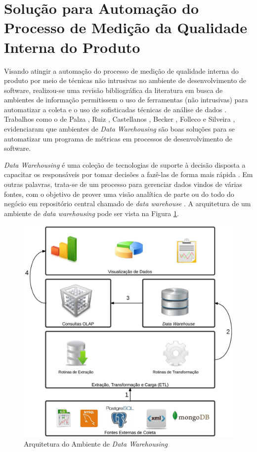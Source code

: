 \section{Solução para Automação do Processo de Medição da Qualidade Interna do Produto}
\label{sec:solucao}

Visando atingir a automação do processo de medição de qualidade interna do produto por meio de técnicas não intrusivas no ambiente de desenvolvimento de software, realizou-se uma revisão bibliográfica da literatura em busca de ambientes de informação permitissem o uso de ferramentas (não intrusivas) para automatizar a coleta e o uso de sofisticadas técnicas de análise de dados \cite{Gopal2005} . Trabalhos como o de Palza \cite{Palza2003},  Ruiz \cite{Ruiz2005}, Castellanos \cite{Castellanos2005},  Becker \cite{Becker2006}, Folleco \cite{Folleco2007} e Silveira \cite{Silveira2010}, evidenciaram que ambientes de \textit{Data Warehousing} são boas soluções para se automatizar um programa de métricas em processos de desenvolvimento de software.

\textit{Data Warehousing} é uma coleção de tecnologias de suporte à decisão disposta a capacitar os responsáveis por tomar decisões a fazê-las de forma mais rápida \cite{chaudhuri1997} \cite{andre2000}. Em outras palavras, trata-se de um processo para gerenciar dados vindos de várias fontes, com o objetivo de prover uma visão analítica de parte ou do todo do negócio em repositório central chamado de \textit{data warehouse} \cite{gardner1998} \cite{Kimball2002}. A arquitetura de um ambiente de \textit{data warehousing} pode ser vista na Figura \ref{arquitetura}. 

\begin{figure}[ht!]
\centering
\includegraphics[keepaspectratio=false,scale=0.14]{figuras/Dwing.eps}
\caption{Arquitetura do Ambiente de \textit{Data Warehousing}}
\label{arquitetura}
\end{figure}
\FloatBarrier


